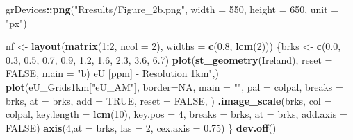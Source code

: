 \documentclass[
  12pt,
]{article}
\newenvironment{Shaded}{\begin{snugshade}}{\end{snugshade}}
\newcommand{\DataTypeTok}[1]{\textcolor[rgb]{0.13,0.29,0.53}{#1}}
\newcommand{\DecValTok}[1]{\textcolor[rgb]{0.00,0.00,0.81}{#1}}
\newcommand{\FloatTok}[1]{\textcolor[rgb]{0.00,0.00,0.81}{#1}}
\newcommand{\KeywordTok}[1]{\textcolor[rgb]{0.13,0.29,0.53}{\textbf{#1}}}
\newcommand{\NormalTok}[1]{#1}
\newcommand{\OperatorTok}[1]{\textcolor[rgb]{0.81,0.36,0.00}{\textbf{#1}}}
\newcommand{\OtherTok}[1]{\textcolor[rgb]{0.56,0.35,0.01}{#1}}
\newcommand{\StringTok}[1]{\textcolor[rgb]{0.31,0.60,0.02}{#1}}
\begin{document}
\begin{Shaded}
\begin{Highlighting}[]
\NormalTok{  grDevices}\OperatorTok{::}\KeywordTok{png}\NormalTok{(}\StringTok{"Rresults/Figure\_2b.png"}\NormalTok{,}
                 \DataTypeTok{width  =} \DecValTok{550}\NormalTok{,}
                 \DataTypeTok{height =} \DecValTok{650}\NormalTok{,}
                 \DataTypeTok{unit =} \StringTok{"px"}\NormalTok{) }
  
\NormalTok{  nf \textless{}{-}}\StringTok{ }\KeywordTok{layout}\NormalTok{(}\KeywordTok{matrix}\NormalTok{(}\DecValTok{1}\OperatorTok{:}\DecValTok{2}\NormalTok{, }\DataTypeTok{ncol =} \DecValTok{2}\NormalTok{), }\DataTypeTok{widths =} \KeywordTok{c}\NormalTok{(}\FloatTok{0.8}\NormalTok{, }\KeywordTok{lcm}\NormalTok{(}\DecValTok{2}\NormalTok{)))}
\NormalTok{  \{brks \textless{}{-}}\StringTok{ }\KeywordTok{c}\NormalTok{(}\FloatTok{0.0}\NormalTok{, }\FloatTok{0.3}\NormalTok{, }\FloatTok{0.5}\NormalTok{, }\FloatTok{0.7}\NormalTok{, }\FloatTok{0.9}\NormalTok{, }\FloatTok{1.2}\NormalTok{, }\FloatTok{1.6}\NormalTok{, }\FloatTok{2.3}\NormalTok{, }\FloatTok{3.6}\NormalTok{, }\FloatTok{6.7}\NormalTok{)}
  \KeywordTok{plot}\NormalTok{(}\KeywordTok{st\_geometry}\NormalTok{(Ireland),}
       \DataTypeTok{reset =} \OtherTok{FALSE}\NormalTok{, }
       \DataTypeTok{main =} \StringTok{"b) eU [ppm] {-} Resolution 1km"}\NormalTok{,)}
  \KeywordTok{plot}\NormalTok{(eU\_Grids1km[}\StringTok{"eU\_AM"}\NormalTok{], }\DataTypeTok{border=}\OtherTok{NA}\NormalTok{,}
       \DataTypeTok{main =} \StringTok{""}\NormalTok{,}
       \DataTypeTok{pal =}\NormalTok{ colpal, }
       \DataTypeTok{breaks =}\NormalTok{ brks,}
       \DataTypeTok{at =}\NormalTok{ brks,}
       \DataTypeTok{add =} \OtherTok{TRUE}\NormalTok{,}
       \DataTypeTok{reset =} \OtherTok{FALSE}\NormalTok{,}
\NormalTok{       )}
  \KeywordTok{.image\_scale}\NormalTok{(brks,}
               \DataTypeTok{col =}\NormalTok{ colpal, }
               \DataTypeTok{key.length =} \KeywordTok{lcm}\NormalTok{(}\DecValTok{10}\NormalTok{),}
               \DataTypeTok{key.pos =} \DecValTok{4}\NormalTok{,}
               \DataTypeTok{breaks =}\NormalTok{ brks,}
               \DataTypeTok{at =}\NormalTok{ brks, }
               \DataTypeTok{add.axis =} \OtherTok{FALSE}\NormalTok{)}
  \KeywordTok{axis}\NormalTok{(}\DecValTok{4}\NormalTok{,}\DataTypeTok{at =}\NormalTok{ brks, }\DataTypeTok{las =} \DecValTok{2}\NormalTok{, }\DataTypeTok{cex.axis =} \FloatTok{0.75}\NormalTok{)}
\NormalTok{  \}}
  \KeywordTok{dev.off}\NormalTok{()}
\end{Highlighting}
\end{Shaded}
\end{document}
